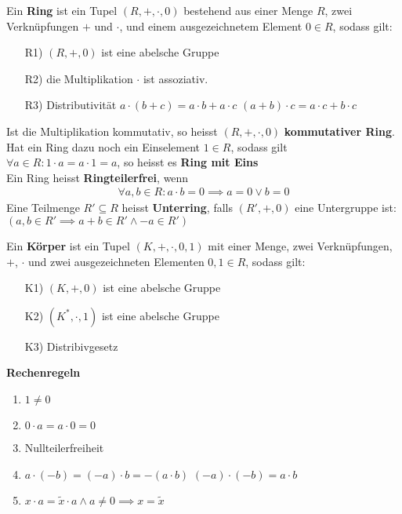 \begin{mdframed}
Ein \textbf{Ring} ist ein Tupel $(R,+,\mathbf{\cdot},0)$ bestehend aus einer Menge $R$, zwei Verknüpfungen $+$ und $\cdot$, und einem ausgezeichnetem Element $0 \in R$, sodass gilt:
\begin{itemize}
    \item[R1)] $(R,+,0)$ ist eine abelsche Gruppe
    \item[R2)] die Multiplikation $\cdot$ ist assoziativ.
    \item[R3)] Distributivität $a \cdot (b+c) = a\cdot b + a\cdot c$ \quad $(a+b)\cdot c = a\cdot c + b\cdot c$  
\end{itemize}
\end{mdframed}
Ist die Multiplikation kommutativ, so heisst $(R,+,\mathbf{\cdot},0)$ \textbf{kommutativer Ring}. Hat ein Ring dazu noch ein Einselement $1 \in R$, sodass gilt $\forall a \in R: 1 \cdot a = a\cdot 1 = a$, so heisst es \textbf{Ring mit Eins}\\
Ein Ring heisst \textbf{Ringteilerfrei}, wenn 
\begin{align*}
    \forall a,b \in R: a\cdot b = 0 \implies a= 0 \lor b = 0
\end{align*}
Eine Teilmenge $R' \subseteq R$ heisst \textbf{Unterring}, falls $(R',+,0)$ eine Untergruppe ist: $ (a,b \in R' \implies a + b \in R' \land - a \in R')$ 
\begin{mdframed}
Ein \textbf{Körper} ist ein Tupel $(K, +, \cdot, 0,1)$ mit einer Menge, zwei Verknüpfungen, $+$, $\cdot$ und zwei ausgezeichneten Elementen $0, 1 \in R$, sodass gilt:
\begin{itemize}
    \item[K1)] $(K,+,0)$ ist eine abelsche Gruppe
    \item[K2)] $(K^*, \cdot,1)$ ist eine abelsche Gruppe
    \item[K3)] Distribivgesetz  
\end{itemize}
\end{mdframed}
\textbf{Rechenregeln}
\begin{enumerate}[{(}a{)}]
    \item $1 \neq 0$
    \item $0 \cdot a = a \cdot 0 = 0$
    \item Nullteilerfreiheit
    \item $a \cdot (-b) = (-a)\cdot b = -(a\cdot b)$ \quad $(-a)\cdot (-b) = a \cdot b$
    \item $x\cdot a = \tilde{x}\cdot a \land a \neq 0 \implies x = \tilde{x}$
\end{enumerate}
